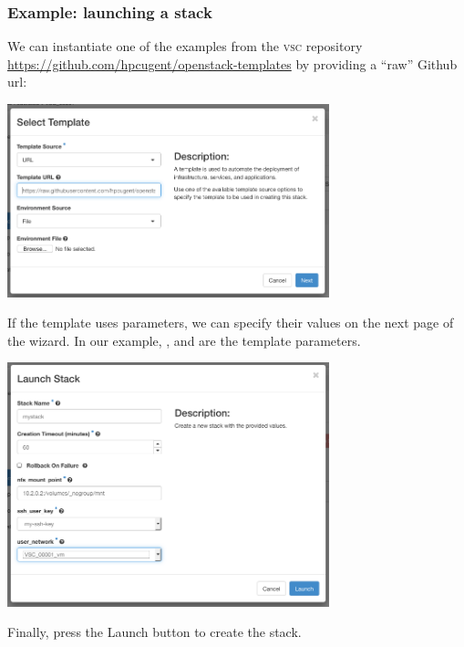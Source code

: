 \subsubsection{Example: launching a stack}
We can instantiate one of the examples from the \textsc{vsc}
repository \url{https://github.com/hpcugent/openstack-templates} by
providing a ``raw'' Github url:
\begin{center}
  \includegraphics[width=0.7\textwidth]{img/launch_stack_template}
\end{center}
If the template uses parameters, we can specify their values on the
next page of the wizard.  In our example, ,
 and  are the template
parameters.
\begin{center}
  \includegraphics[width=0.7\textwidth]{img/launch_stack_parameters}
\end{center}
Finally, press the Launch button to create the stack.

